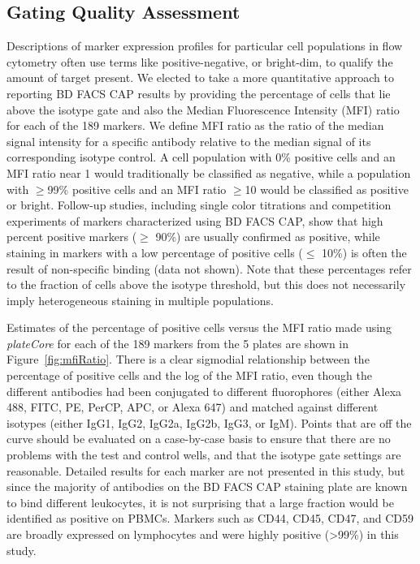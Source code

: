 \documentclass[12pt]{article}
\newcommand{\Rpackage}[1]{{\textit{#1}}}
\begin{document}
\subsection*{Gating Quality Assessment}

Descriptions of marker expression profiles for particular cell populations in
flow cytometry often use terms like positive-negative, or bright-dim, to
qualify the amount of target present. We elected to take a more quantitative
approach to reporting BD FACS CAP results by providing the percentage of cells
that lie above the isotype gate and also the Median Fluorescence Intensity (MFI)
ratio for each of the 189 markers. We define MFI ratio as the ratio of
the median signal intensity for a specific antibody relative to the median
signal of its corresponding isotype control. A cell population with 0\%
positive cells and an MFI ratio near 1 would traditionally be classified as
negative, while a population with $\ge$99\% positive cells and an MFI ratio
$\ge$10 would be classified as positive or bright. Follow-up studies, including
single color titrations and competition experiments of markers characterized
using BD FACS CAP, show that high percent positive markers ($\ge$ 90\%) are
usually confirmed as positive, while staining in markers with a low percentage
of positive cells ($\le$ 10\%) is often the result of non-specific binding (data
not shown). Note that these percentages refer to the fraction of cells above
the isotype threshold, but this does not necessarily imply heterogeneous
staining in multiple populations.

Estimates of the percentage of positive cells versus the MFI ratio made using
\Rpackage{plateCore} for each of the 189 markers from the 5 plates are shown
in Figure~\ref{fig:mfiRatio}. There is a clear sigmodial relationship
between the percentage of positive cells and the log of the MFI ratio, even
though the different antibodies had been conjugated to different fluorophores
(either Alexa 488, FITC, PE, PerCP, APC, or Alexa 647) and matched against
different isotypes (either IgG1, IgG2, IgG2a, IgG2b, IgG3, or IgM). Points that
are off the curve should be evaluated on a case-by-case basis to ensure that
there are no problems with the test and control wells, and that the isotype
gate settings are reasonable. Detailed results for each marker are not
presented in this study, but since the majority of antibodies on the BD FACS
CAP staining plate are known to bind different leukocytes, it is not surprising
that a large fraction would be identified as positive on PBMCs. Markers such as
CD44, CD45, CD47, and CD59 are broadly expressed on lymphocytes and were highly
positive (>99\%) in this study.
\end{document}
